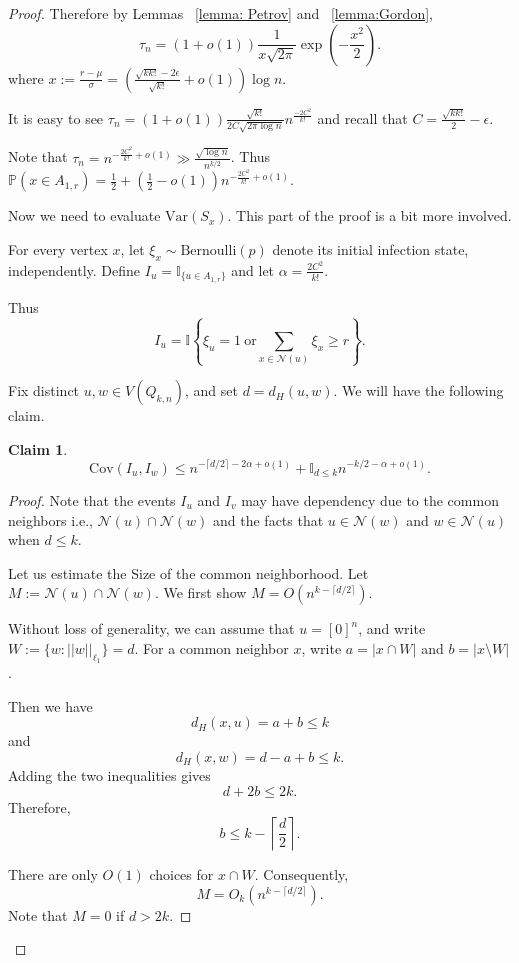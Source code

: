 \documentclass[reqno,11pt]{amsart}
\newtheorem{claim}[theorem]{Claim}
\renewcommand{\le}{\leqslant}
\renewcommand{\ge}{\geqslant}
\begin{document}
\begin{proof}
Therefore by Lemmas ~\ref{lemma: Petrov} and ~\ref{lemma:Gordon}, $$\tau_n=(1+o(1))\frac{1}{x\sqrt{2\pi}}\exp(-\frac{x^2}{2}).$$
where $x:=\frac{r-\mu}{\sigma}=\left(\frac{\sqrt{kk!}-2\epsilon}{\sqrt{k!}}+o(1)\right) \log n.$


It is easy to see $\tau_n=(1+o(1))\frac{\sqrt{k!}}{2C \sqrt{2\pi \log n}} n^{\frac{-2C^2}{k!}}$ and recall that $C=\frac{\sqrt{kk!}}{2}-\epsilon$.

Note that $\tau_n=n^{-\frac{2C^2}{k!}+o(1)} \gg \frac{\sqrt{\log n}}{n^{k/2}}$. Thus $\mathbb{P}(x \in A_{1,r})=\frac{1}{2}+(\frac{1}{2}-o(1))n^{-\frac{2C^2}{k!}+o(1)}$.

\vspace{1em}
Now we need to evaluate $\text{Var}(S_x)$. This part of the proof is a bit more involved.

For every vertex $x$, let $\xi_x\sim \text{Bernoulli}(p)$ denote its initial infection state, independently. Define $I_u=\mathbb{I}_{\{u \in  A_{1,r}\}}$ and let $\alpha=\frac{2C^2}{k!}$.

Thus
$$I_u= \mathbb{I}\left\{ \xi_u=1 \ \text{or}
\sum_{x\in \mathcal{N}(u)}\xi_x\ge r \right\}.$$

Fix distinct $u,w \in V(Q_{k,n})$, and set $d=d_H(u,w)$. We will have the following claim.

\begin{claim}
$$
\text{Cov}(I_u,I_w) \le
n^{-\lceil d/2\rceil-2\alpha+o(1)} + \mathbb{I}_{{d\le k}} n^{-k/2-\alpha+o(1)}.
$$
\end{claim}

\begin{proof}
Note that the events $I_u$ and $I_v$ may have dependency due to the common neighbors i.e., $\mathcal{N}(u)\cap \mathcal{N}(w)$ and the facts that $u\in \mathcal{N}(w)$ and $w\in \mathcal{N}(u)$ when $d\le k$.

Let us estimate the Size of the common neighborhood. Let $M:=\mathcal{N}(u)\cap \mathcal{N}(w)$. We first show $M=O\left(n^{k-\lceil d/2\rceil}\right)$.

Without loss of generality, we can assume that $u=[0]^n$, and write  $W:=\{w:||w||_{\ell_1}\}=d$. For a common neighbor $x$, write $a=|x\cap W|$ and $b=|x\setminus W|$.

Then we have 
$$d_H(x,u)=a+b\le k $$
and
$$d_H(x,w)=d-a+b\le k.$$
Adding the two inequalities gives
$$d+2b\le 2k.$$
Therefore,
$$b\le k-\left\lceil\frac d2\right\rceil.$$

There are only $O(1)$ choices for $x\cap W$. Consequently,
$$
M = O_k\left( n^{k-\lceil d/2\rceil}\right).
$$
Note that $M=0$ if $d>2k$.


\end{proof}
\end{proof}
\end{document}
